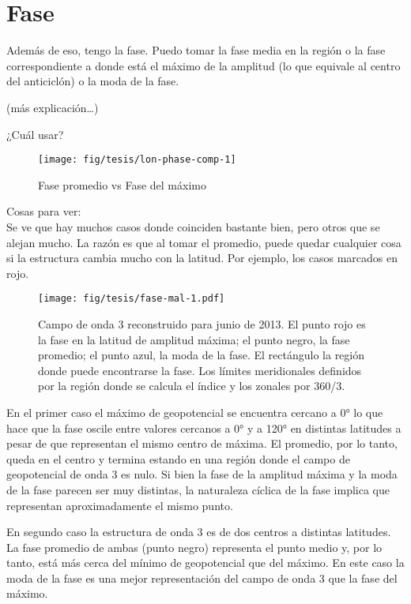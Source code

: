 \documentclass[spanish,a4paper]{book}
\begin{document}
\section{Fase}\label{fase}

Además de eso, tengo la fase. Puedo tomar la fase media en la región o
la fase correspondiente a donde está el máximo de la amplitud (lo que
equivale al centro del anticiclón) o la moda de la fase.

(más explicación\ldots{})

¿Cuál usar?

\begin{figure}

{\centering \texttt{[image: fig/tesis/lon-phase-comp-1]} 

}

\caption{Fase promedio vs Fase del máximo}\label{fig:lon-phase-comp}
\end{figure}

Cosas para ver:\\
Se ve que hay muchos casos donde coinciden bastante bien, pero otros que
se alejan mucho. La razón es que al tomar el promedio, puede quedar
cualquier cosa si la estructura cambia mucho con la latitud. Por
ejemplo, los casos marcados en rojo.

\begin{figure}
\centering
\texttt{[image: fig/tesis/fase-mal-1.pdf]}
\caption{Campo de onda 3 reconstruido para junio de 2013. El punto rojo
es la fase en la latitud de amplitud máxima; el punto negro, la fase
promedio; el punto azul, la moda de la fase. El rectángulo la región
donde puede encontrarse la fase. Los límites meridionales definidos por
la región donde se calcula el índice y los zonales por 360/3.}
\end{figure}

En el primer caso el máximo de geopotencial se encuentra cercano a 0° lo
que hace que la fase oscile entre valores cercanos a 0° y a 120° en
distintas latitudes a pesar de que representan el mismo centro de
máxima. El promedio, por lo tanto, queda en el centro y termina estando
en una región donde el campo de geopotencial de onda 3 es nulo. Si bien
la fase de la amplitud máxima y la moda de la fase parecen ser muy
distintas, la naturaleza cíclica de la fase implica que representan
aproximadamente el mismo punto.

En segundo caso la estructura de onda 3 es de dos centros a distintas
latitudes. La fase promedio de ambas (punto negro) representa el punto
medio y, por lo tanto, está más cerca del mínimo de geopotencial que del
máximo. En este caso la moda de la fase es una mejor representación del
campo de onda 3 que la fase del máximo.
\end{document}
